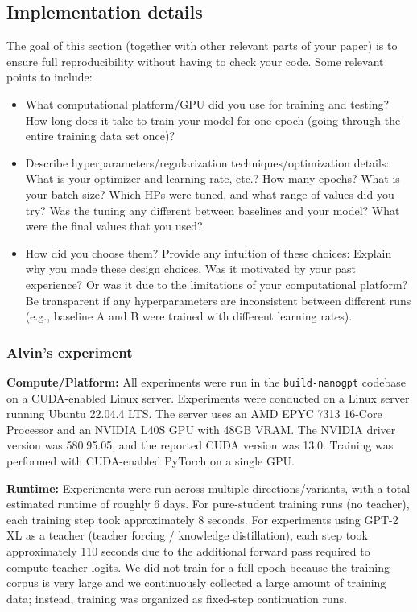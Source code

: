 \documentclass{article}
\begin{document}
\subsection{Implementation details}
\label{sec:implementation_details}
The goal of this section (together with other relevant parts of your paper) is to ensure full reproducibility without having to check your code.
Some relevant points to include:
\begin{itemize}
    \item What computational platform/GPU did you use for training and testing? How long does it take to train your model for one epoch (going through the entire training data set once)?
    \item Describe hyperparameters/regularization techniques/optimization details: What is your optimizer and learning rate, etc.? How many epochs? What is your batch size? Which HPs were tuned, and what range of values did you try? Was the tuning any different between baselines and your model? What were the final values that you used?
    \item How did you choose them? Provide any intuition of these choices: Explain why you made these design choices. Was it motivated by your past experience? Or was it due to the limitations of your computational platform? Be transparent if any hyperparameters are inconsistent between different runs (e.g., baseline A and B were trained with different learning rates).
\end{itemize}

\subsubsection{Alvin's experiment}
\label{sec:alvins_experiment}
\noindent\textbf{Compute/Platform:} All experiments were run in the \texttt{build-nanogpt} codebase on a CUDA-enabled Linux server. Experiments were conducted on a Linux server running Ubuntu 22.04.4 LTS.
The server uses an AMD EPYC 7313 16-Core Processor and an NVIDIA L40S GPU with 48GB VRAM. The NVIDIA driver version was 580.95.05, and the reported CUDA version was 13.0. Training was performed with CUDA-enabled PyTorch on a single GPU.

\noindent\textbf{Runtime:} Experiments were run across multiple directions/variants, with a total estimated runtime of roughly 6 days. For pure-student training runs (no teacher), each training step took approximately 8 seconds. For experiments using GPT-2 XL as a teacher (teacher forcing / knowledge distillation), each step took approximately 110 seconds due to the additional forward pass required to compute teacher logits. We did not train for a full epoch because the training corpus is very large and we continuously collected a large amount of training data; instead, training was organized as fixed-step continuation runs.
\end{document}
